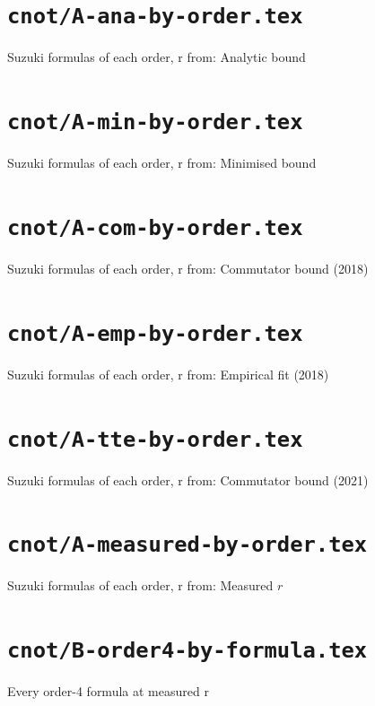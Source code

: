 \documentclass{article}
\begin{document}
\section*{\texttt{cnot/A-ana-by-order.tex}}
Suzuki formulas of each order, r from: Analytic bound\par\medskip

\clearpage

\section*{\texttt{cnot/A-min-by-order.tex}}
Suzuki formulas of each order, r from: Minimised bound\par\medskip

\clearpage

\section*{\texttt{cnot/A-com-by-order.tex}}
Suzuki formulas of each order, r from: Commutator bound (2018)\par\medskip

\clearpage

\section*{\texttt{cnot/A-emp-by-order.tex}}
Suzuki formulas of each order, r from: Empirical fit (2018)\par\medskip

\clearpage

\section*{\texttt{cnot/A-tte-by-order.tex}}
Suzuki formulas of each order, r from: Commutator bound (2021)\par\medskip

\clearpage

\section*{\texttt{cnot/A-measured-by-order.tex}}
Suzuki formulas of each order, r from: Measured $r$\par\medskip

\clearpage

\section*{\texttt{cnot/B-order4-by-formula.tex}}
Every order-4 formula at measured r\par\medskip

\clearpage
\end{document}
